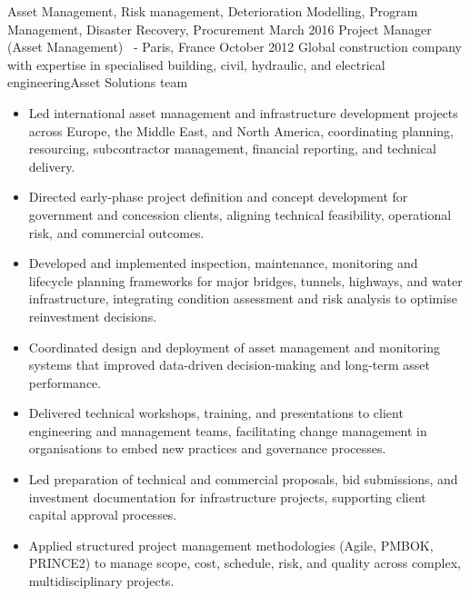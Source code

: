 \begin{experiences}
{\begin{itemize}
		                                                      
                      \end{itemize}
                    }
                    {Asset Management, Risk management, Deterioration Modelling, Program Management, Disaster Recovery, Procurement}
  \emptySeparator
  \consultantexperience
    {March 2016}     {Project Manager (Asset Management)}{ \ - }{Paris, France}
    {October 2012}   {Global construction company with expertise in specialised building, civil, hydraulic, and electrical engineering}{Asset Solutions team}
      {
                      \begin{itemize}
\item Led international asset management and infrastructure development projects across Europe, the Middle East, and North America, coordinating planning, resourcing, subcontractor management, financial reporting, and technical delivery.
\item Directed early-phase project definition and concept development for government and concession clients, aligning technical feasibility, operational risk, and commercial outcomes.
\item Developed and implemented inspection, maintenance,  monitoring and lifecycle planning frameworks for major bridges, tunnels, highways, and water infrastructure, integrating condition assessment and risk analysis to optimise reinvestment decisions.
\item Coordinated design and deployment of asset management and monitoring systems that improved data-driven decision-making and long-term asset performance.
\item Delivered technical workshops, training, and presentations to client engineering and management teams, facilitating change management in organisations to embed new practices and governance processes.
\item Led preparation of technical and commercial proposals, bid submissions, and investment documentation for infrastructure projects, supporting client capital approval processes.
\item Applied structured project management methodologies (Agile, PMBOK, PRINCE2) to manage scope, cost, schedule, risk, and quality across complex, multidisciplinary projects.


\end{itemize}}
\end{experiences}
